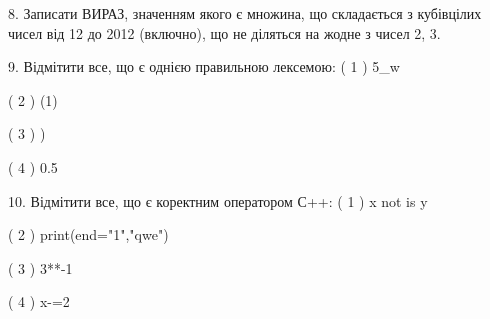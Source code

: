 \documentclass[11pt]{article}
\begin{document}

8. 
Записати ВИРАЗ, значенням якого є множина, що складається з кубівцілих чисел від 12 до 2012 (включно), що не діляться на жодне з чисел 2, 3.

9. %
Відмітити все, що є однією правильною лексемою:
( 1 ) 5_w

( 2 ) (1)

( 3 ) )

( 4 ) 0.5


10. %
Відмітити все, що є коректним оператором С++:
( 1 ) x not is y

( 2 ) print(end="1","qwe")

( 3 ) 3**-1

( 4 ) x-=2


\newpage
\end{document}

